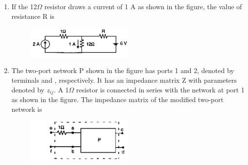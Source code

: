 \documentclass[12pt]{article}
\theoremstyle{remark}
\begin{document}
\begin{enumerate}
\item If the 12$\Omega$ resistor draws a current of 1 A as shown in the figure, the value of resistance R is
\begin{figure}[H]
    \centering
    \includegraphics[width=0.5\textwidth]{Figs/Q33.png}
    \caption{}
    \label{fig:1.22}
\end{figure}
\begin{enumerate}
\end{enumerate}
\hfill{}

\item The two-port network P shown in the figure has ports 1 and 2, denoted by terminals  and , respectively. It has an impedance matrix Z with parameters denoted by $z_{ij}$. A 1$\Omega$ resistor is connected in series with the network at port 1 as shown in the figure. The impedance matrix of the modified two-port network  is
\begin{figure}[H]
    \centering
    \includegraphics[width=0.5\textwidth]{Figs/Q34.png}
    \caption{}
    \label{fig:1.23}
\end{figure}
\begin{enumerate}
\end{enumerate}
\hfill{}


\end{enumerate}
\end{document}
